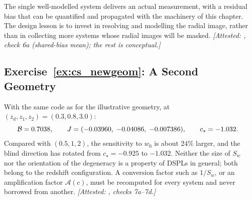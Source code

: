 The single well-modelled system delivers an actual measurement,
with a residual bias that can be quantified and propagated with the
machinery of this chapter. The design lesson is to invest in resolving
and modelling the radial image, rather than in collecting more systems
whose radial images will be masked.
\emph{[Attested: , check 6a (shared-bias mean); the rest is conceptual.]}

\subsection*{Exercise~\ref{ex:cs_newgeom}: A Second Geometry}

With the same code as for the illustrative geometry, at
$(z_d,z_1,z_2)=(0.3,0.8,3.0)$:
\[
  \mathcal{B}=0.7038,\qquad
  J=(-0.03960,\;-0.04086,\;-0.007386),\qquad
  c_\star=-1.032 .
\]
Compared with $(0.5,1,2)$, the sensitivity to $w_0$ is about $24\%$
larger, and the blind direction has rotated from $c_\star=-0.925$ to
$-1.032$. Neither the size of $S_w$ nor the orientation of the
degeneracy is a property of DSPLs in general; both belong to the
redshift configuration. A conversion factor such as $1/S_w$, or an
amplification factor $\mathcal{A}(c)$, must be recomputed for every
system and never borrowed from another.
\emph{[Attested: , checks 7a--7d.]}
